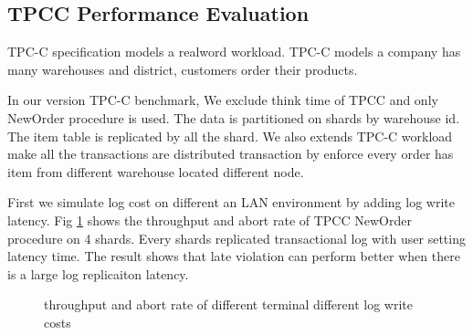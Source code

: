 \documentclass[conference]{IEEEtran}
\begin{document}
\subsection{TPCC Performance Evaluation}

TPC-C specification models a realword workload.
TPC-C models a company has many warehouses and district, customers order their products.

In our version TPC-C benchmark,
We exclude think time of TPCC and only NewOrder procedure is used.
The data is partitioned on shards by warehouse id.
The item table is replicated by all the shard.
We also extends TPC-C workload make all the transactions are distributed transaction by enforce every order has item from different warehouse located different node.

First we simulate log cost on different an LAN environment by adding log write latency.
Fig \ref{fig:new_order_add_log_cost} shows the throughput and abort rate of TPCC NewOrder procedure on 4 shards. 
Every shards replicated transactional log with user setting latency time.
The result shows that late violation can perform better when there is a large log replicaiton latency.

\begin{figure}[htbp]
  \centering
\caption{throughput and abort rate of
different terminal different log write costs}
\label{fig:new_order_add_log_cost}
\end{figure}
\end{document}
